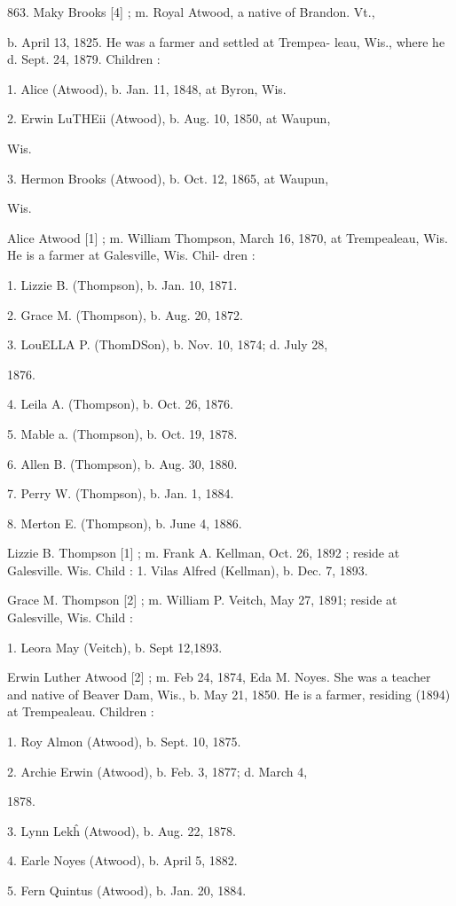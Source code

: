 \documentclass{book}
\begin{document}
863. Maky Brooks [4] ; m. Royal Atwood, a native of Brandon. Vt., 

b. April 13, 1825. He was a farmer and settled at Trempea- 
leau, Wis., where he d. Sept. 24, 1879. Children : 

1. Alice (Atwood), b. Jan. 11, 1848, at Byron, Wis. 

2. Erwin LuTHEii (Atwood), b. Aug. 10, 1850, at Waupun, 

Wis. 

3. Hermon Brooks (Atwood), b. Oct. 12, 1865, at Waupun, 

Wis. 

Alice Atwood [1] ; m. William Thompson, March 16, 1870, at 
Trempealeau, Wis. He is a farmer at Galesville, Wis. Chil- 
dren : 

1. Lizzie B. (Thompson), b. Jan. 10, 1871. 

2. Grace M. (Thompson), b. Aug. 20, 1872. 

3. LouELLA P. (ThomDSon), b. Nov. 10, 1874; d. July 28, 

1876. 

4. Leila A. (Thompson), b. Oct. 26, 1876. 

5. Mable a. (Thompson), b. Oct. 19, 1878. 

6. Allen B. (Thompson), b. Aug. 30, 1880. 

7. Perry W. (Thompson), b. Jan. 1, 1884. 

8. Merton E. (Thompson), b. June 4, 1886. 

Lizzie B. Thompson [1] ; m. Frank A. Kellman, Oct. 26, 1892 ; 
reside at Galesville. Wis. Child : 
1. Vilas Alfred (Kellman), b. Dec. 7, 1893. 

Grace M. Thompson [2] ; m. William P. Veitch, May 27, 1891; 
reside at Galesville, Wis. Child : 

1. Leora May (Veitch), b. Sept 12,1893. 

Erwin Luther Atwood [2] ; m. Feb 24, 1874, Eda M. Noyes. 
She was a teacher and native of Beaver Dam, Wis., b. May 
21, 1850. He is a farmer, residing (1894) at Trempealeau. 
Children : 

1. Roy Almon (Atwood), b. Sept. 10, 1875. 

2. Archie Erwin (Atwood), b. Feb. 3, 1877; d. March 4, 

1878. 

3. Lynn Lek\^h (Atwood), b. Aug. 22, 1878. 

4. Earle Noyes (Atwood), b. April 5, 1882. 

5. Fern Quintus (Atwood), b. Jan. 20, 1884. 
\end{document}
